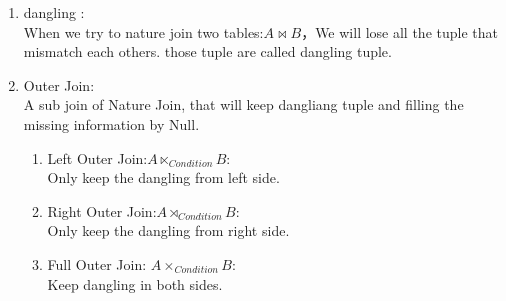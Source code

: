 \begin{enumerate}
\begin{enumerate}
    \end{enumerate}
    \item dangling :\\
        When we try to nature join two tables:$A\bowtie B$，We will lose all the tuple that mismatch each others. those tuple are called dangling tuple.
    \item Outer Join: \\
    A sub join of Nature Join, that will keep dangliang tuple and filling the missing information by Null.
    \begin{enumerate}
        \item Left Outer Join:$A\ltimes _{Condition} B$:\\Only keep the dangling from left side.
        \item Right Outer Join:$A\rtimes _{Condition} B$:\\Only keep the dangling from right side.
        \item Full Outer Join: $A\times _{Condition}B$:\\Keep dangling in both sides.
    \end{enumerate} 
        

\end{enumerate}